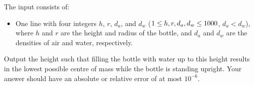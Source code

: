\begin{Input}
    The input consists of:
    \begin{itemize}
        \item One line with four integers $h$, $r$, $d_a$, and $d_w$ ($1 \leq h, r, d_a, d_w \leq 1000$, $d_a < d_w$), where $h$ and $r$ are the height and radius of the bottle, and $d_a$ and $d_w$ are the densities of air and water, respectively.
    \end{itemize}
\end{Input}

\begin{Output}
    Output the height such that filling the bottle with water up to this height results in the lowest possible centre of mass while the bottle is standing upright.
    Your answer should have an absolute or relative error of at most $10^{-6}$.
\end{Output}

\pagebreak %
